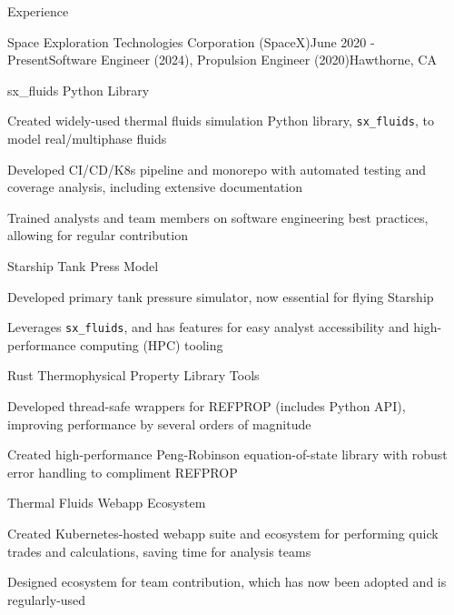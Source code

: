 \documentclass{resume} %
\begin{document}

\begin{rSection}{Experience}

  \begin{rSubsection}{{Space Exploration Technologies Corporation (SpaceX)}}{June 2020 - Present}{Software Engineer (2024), Propulsion Engineer (2020)}{Hawthorne, CA}
  \begin{rSubsubsection}{sx\_fluids Python Library}
    \item {\small Created widely-used thermal fluids simulation Python library, \texttt{sx\_fluids}, to model real/multiphase fluids}
    \item {\small Developed CI/CD/K8s pipeline and monorepo with automated testing and coverage analysis, including extensive documentation}
    \item {\small Trained analysts and team members on software engineering best practices, allowing for regular contribution}
  \end{rSubsubsection}

  \begin{rSubsubsection}{Starship Tank Press Model}
    \item {\small Developed primary tank pressure simulator, now essential for flying Starship}
    \item {\small Leverages \texttt{sx\_fluids}, and has features for easy analyst accessibility and high-performance computing (HPC) tooling}
  \end{rSubsubsection}

  \begin{rSubsubsection}{Rust Thermophysical Property Library Tools}
    \item {\small Developed thread-safe wrappers for REFPROP (includes Python API), improving performance by several orders of magnitude}
    \item {\small Created high-performance Peng-Robinson equation-of-state library with robust error handling to compliment REFPROP}
  \end{rSubsubsection}

  \begin{rSubsubsection}{Thermal Fluids Webapp Ecosystem}
    \item {\small Created Kubernetes-hosted webapp suite and ecosystem for performing quick trades and calculations, saving time for analysis teams}
    \item {\small Designed ecosystem for team contribution, which has now been adopted and is regularly-used}
  \end{rSubsubsection}


\end{rSubsection}
\end{rSection}
\end{document}
